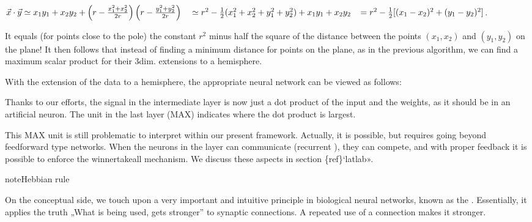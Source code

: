 \documentclass[a4paper,12pt,polish]{jupyterBook}
\begin{document}
\sphinxAtStartPar
\(\vec{x} \cdot \vec{y} \simeq x_1 y_1 + x_2 y_2 + \left( r -\frac{x_1^2+x_2^2}{2r} \right) \left( r -\frac{y_1^2+y_2^2}{2r} \right) \\ 
\;\;\;\simeq r^2 - \frac{1}{2} (x_1^2+x_2^2 +y_1^2+y_2^2) + x_1 y_1+x_2 y_2 \\ 
\;\;\; = r^2 - \frac{1}{2}[ (x_1-x_2)^2 +(y_1-y_2)^2]\).

\sphinxAtStartPar
It equals (for points close to the pole) the constant \( r ^ 2 \) minus half the square of the distance between the points \( (x_1, x_2) \) and \( (y_1, y_2) \) on the plane! It then follows that instead of finding a minimum distance for points on the plane, as in the previous algorithm, we can find a maximum scalar product for their 3\sphinxhyphen{}dim. extensions to a hemisphere.

\sphinxAtStartPar
With the extension of the data to a hemisphere, the appropriate neural network can be viewed as follows:
\begin{sphinxVerbatimOutput}

\noindent{}
\end{sphinxVerbatimOutput}

\sphinxAtStartPar
Thanks to our efforts, the signal in the intermediate layer is now just a dot product of the input and the weights, as it should be in an artificial neuron. The unit in the last layer (MAX) indicates where the dot product is largest.

\sphinxAtStartPar
This MAX unit is still problematic to interpret within our present framework. Actually, it is possible, but requires going beyond feed\sphinxhyphen{}forward type networks. When the neurons in the layer can communicate (recurrent ), they can compete, and with proper feed\sphinxhyphen{}back it is possible to enforce the winner\sphinxhyphen{}take\sphinxhyphen{}all mechanism. We discuss these aspects in section \{ref\}`lat\sphinxhyphen{}lab».

\begin{sphinxadmonition}{note}{Hebbian rule}

\sphinxAtStartPar
On the conceptual side, we touch upon a very important and intuitive principle in biological neural networks, known as the . Essentially, it applies the truth „What is being used, gets stronger” to synaptic connections. A repeated use of a connection makes it stronger.
\end{sphinxadmonition}
\end{document}
